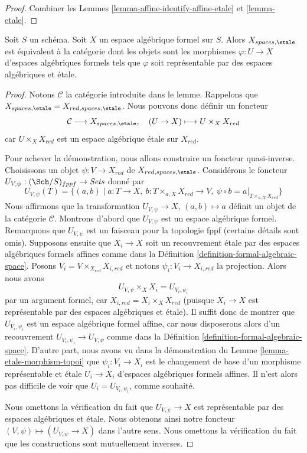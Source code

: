 \begin{proof}
Combiner les Lemmes \ref{lemma-affine-identify-affine-etale} et \ref{lemma-etale}.
\end{proof}

\begin{lemma}
\label{lemma-identify-spaces-etale}
Soit $S$ un schéma. Soit $X$ un espace algébrique formel sur $S$.
Alors $X_{spaces, \etale}$ est équivalent à la catégorie dont les objets
sont les morphismes $\varphi : U \to X$ d'espaces algébriques formels tels que
$\varphi$ soit représentable par des espaces algébriques et \'etale.
\end{lemma}

\begin{proof}
Notons $\mathcal{C}$ la catégorie introduite dans le lemme.
Rappelons que $X_{spaces, \etale} = X_{red, spaces, \etale}$.
Nous pouvons donc définir un foncteur
$$
\mathcal{C} \longrightarrow X_{spaces, \etale},\quad
(U \to X) \longmapsto U \times_X X_{red}
$$
car $U \times_X X_{red}$ est un espace algébrique \'etale sur $X_{red}$.

\medskip\noindent
Pour achever la démonstration, nous allons construire un foncteur quasi-inverse.
Choisissons un objet $\psi : V \to X_{red}$ de $X_{red, spaces, \etale}$.
Considérons le foncteur
$U_{V, \psi} : (\Sch/S)_{fppf} \to \textit{Sets}$ donné par
$$
U_{V, \psi}(T) = \{(a, b) \mid
a : T \to X,
\ b : T \times_{a, X} X_{red} \to V,
\ \psi \circ b = a|_{T \times_{a, X} X_{red}}\}
$$
Nous affirmons que la transformation $U_{V, \psi} \to X$, $(a, b) \mapsto a$
définit un objet de la catégorie $\mathcal{C}$.
Montrons d'abord que $U_{V, \psi}$ est un espace algébrique formel.
Remarquons que $U_{V, \psi}$ est un faisceau pour la topologie fppf (certains détails
sont omis). Supposons ensuite que $X_i \to X$ soit un recouvrement \'etale par des
espaces algébriques formels affines comme dans la
Définition \ref{definition-formal-algebraic-space}.
Posons $V_i = V \times_{X_{red}} X_{i, red}$ et notons
$\psi_i : V_i \to X_{i, red}$ la projection. Alors 
nous avons
$$
U_{V, \psi} \times_X X_i = U_{V_i, \psi_i}
$$
par un argument formel, car $X_{i, red} = X_i \times_X X_{red}$
(puisque $X_i \to X$ est représentable par des espaces algébriques et \'etale).
Il suffit donc de montrer que $U_{V_i, \psi_i}$ est un
espace algébrique formel affine, car nous disposerons alors
d'un recouvrement $U_{V_i, \psi_i} \to U_{V, \psi}$ comme dans la
Définition \ref{definition-formal-algebraic-space}.
D'autre part, nous avons vu dans la démonstration du
Lemme \ref{lemma-etale-morphism-topoi}
que $\psi_i : V_i \to X_i$ est le changement de
base d'un morphisme représentable et \'etale
$U_i \to X_i$ d'espaces algébriques formels affines.
Il n'est alors pas difficile de voir que $U_i = U_{V_i, \psi_i}$,
comme souhaité.

\medskip\noindent
Nous omettons la vérification du fait que $U_{V, \psi} \to X$
est représentable par des espaces algébriques et \'etale.
Nous obtenons ainsi notre foncteur $(V, \psi) \mapsto (U_{V, \psi} \to X)$
dans l'autre sens.
Nous omettons la vérification du fait que les constructions
sont mutuellement inverses.
\end{proof}


